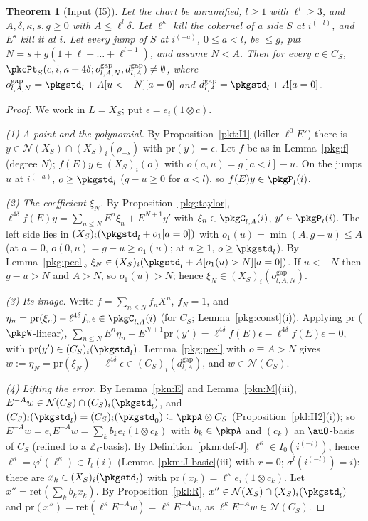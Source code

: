 \documentclass[10pt]{amsart}
\newtheorem{theorem}{Theorem}[section]
\theoremstyle{definition}
\theoremstyle{remark}
\newcommand{\Z}{\mathbb Z}
\begin{document}
\begin{theorem}[Input (I5)]\label{pkg:I5}
Let the chart be unramified, $l\ge1$ with $\ell^l\ge3$, and $A,\delta,\kappa,s,g\ge0$ with $A\le\ell^l\delta$.
Let $\ell^\kappa$ kill the cokernel of a side $S$ at $i^{(-l)}$, and $E^s$ kill it at $i$. Let every jump of
$S$ at $i^{(-a)}$, $0\le a<l$, be $\le g$, put $N=s+g(1+\ell+\dots+\ell^{l-1})$, and assume $N<A$. Then for
every $c\in C_S$, $\pkcPt_S(c,i,\kappa+4\delta;o^{\mathrm{gap}}_{l,A,N},d^{\mathrm{gap}}_{l,A})\ne\emptyset$,
where $o^{\mathrm{gap}}_{l,A,N}=\pkgstd_l+A[u<-N][a=0]$ and $d^{\mathrm{gap}}_{l,A}=\pkgstd_l+A[a=0]$.
\end{theorem}

\begin{proof}
We work in $L=X_S$; put $\epsilon=e_i(1\otimes c)$.

\emph{(1) A point and the polynomial.} By Proposition~\ref{pkt:I1} (killer $\ell^0E^s$) there is
$y\in\mathcal N(X_S)\cap(X_S)_i(\rho_{-s})$ with $\mathrm{pr}(y)=\epsilon$. Let $f$ be as in Lemma~\ref{pkg:f}
(degree $N$); $f(E)y\in(X_S)_i(o)$ with $o(a,u)=g[a<l]-u$. On the jumps $u$ at $i^{(-a)}$, $o\ge\pkgstd_l$
($g-u\ge0$ for $a<l$), so $f(E)y\in\pkgP_l(i)$.

\emph{(2) The coefficient $\xi_N$.} By Proposition~\ref{pkg:taylor}, $\ell^{4\delta}f(E)y=\sum_{n\le N}E^n\xi_n+
E^{N+1}y'$ with $\xi_n\in\pkgC_{l,A}(i)$, $y'\in\pkgP_l(i)$. The left side lies in
$(X_S)_i(\pkgstd_l+o_1[a=0])$ with $o_1(u)=\min(A,g-u)\le A$ (at $a=0$, $o(0,u)=g-u\ge o_1(u)$; at $a\ge1$,
$o\ge\pkgstd_l$). By Lemma~\ref{pkg:peel}, $\xi_N\in(X_S)_i(\pkgstd_l+A[o_1(u)>N][a=0])$. If $u<-N$ then
$g-u>N$ and $A>N$, so $o_1(u)>N$; hence $\xi_N\in(X_S)_i(o^{\mathrm{gap}}_{l,A,N})$.

\emph{(3) Its image.} Write $f=\sum_{n\le N}f_nX^n$, $f_N=1$, and $\eta_n=\mathrm{pr}(\xi_n)-\ell^{4\delta}f_n
\epsilon\in\pkgC_{l,A}(i)$ (for $C_S$; Lemma~\ref{pkg:const}(i)). Applying $\mathrm{pr}$ ($\pkpW$-linear),
$\sum_{n\le N}E^n\eta_n+E^{N+1}\mathrm{pr}(y')=\ell^{4\delta}f(E)\epsilon-\ell^{4\delta}f(E)\epsilon=0$, with
$\mathrm{pr}(y')\in(C_S)_i(\pkgstd_l)$. Lemma~\ref{pkg:peel} with $o\equiv A>N$ gives
$w:=\eta_N=\mathrm{pr}(\xi_N)-\ell^{4\delta}\epsilon\in(C_S)_i(d^{\mathrm{gap}}_{l,A})$, and $w\in\mathcal N(C_S)$.

\emph{(4) Lifting the error.} By Lemma~\ref{pkn:E} and Lemma~\ref{pkn:M}(iii), $E^{-A}w\in\mathcal N(C_S)\cap
(C_S)_i(\pkgstd_l)$, and $(C_S)_i(\pkgstd_l)=(C_S)_i(\pkgstd_0)\subseteq\pkpA\otimes C_S$
(Proposition~\ref{pkl:H2}(i)); so $E^{-A}w=e_iE^{-A}w=\sum_kb_ke_i(1\otimes c_k)$ with $b_k\in\pkpA$ and $(c_k)$ an
$\auO$-basis of $C_S$ (refined to a $\Z_\ell$-basis). By Definition~\ref{pkm:def-J}, $\ell^\kappa\in I_0(i^{(-l)})$,
hence $\ell^\kappa=\varphi^l(\ell^\kappa)\in I_l(i)$ (Lemma~\ref{pkm:J-basic}(iii) with $r=0$; $\sigma^l(i^{(-l)})=i$):
there are $x_k\in(X_S)_i(\pkgstd_l)$ with $\mathrm{pr}(x_k)=\ell^\kappa e_i(1\otimes c_k)$. Let $x''=
\mathrm{ret}(\sum_kb_kx_k)$. By Proposition~\ref{pkl:R}, $x''\in\mathcal N(X_S)\cap(X_S)_i(\pkgstd_l)$ and
$\mathrm{pr}(x'')=\mathrm{ret}(\ell^\kappa E^{-A}w)=\ell^\kappa E^{-A}w$, as $\ell^\kappa E^{-A}w\in\mathcal N(C_S)$.


\end{proof}
\end{document}
